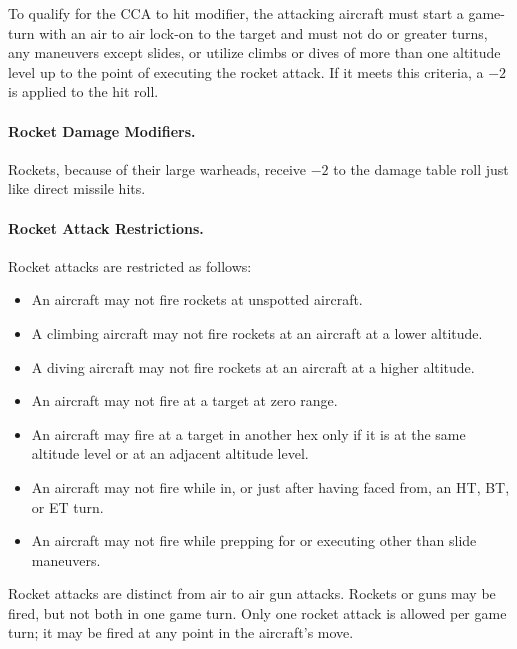 \begin{advancedrules}
{To qualify for the CCA to hit modifier, the attacking aircraft must start a game-turn with an air to air lock-on to the target and must not do  or greater turns, any maneuvers except slides, or utilize climbs or dives of more than one altitude level up to the point of executing the rocket attack. If it meets this criteria, a $-2$ is applied to the hit roll.

\paragraph{Rocket Damage Modifiers.} Rockets, because of their large warheads, receive $-2$ to the damage table roll just like direct missile hits.

\paragraph{Rocket Attack Restrictions.} Rocket attacks are restricted as follows:

\begin{itemize}

    \item An aircraft may not fire rockets at unspotted aircraft.

    \item A climbing aircraft may not fire rockets at an aircraft at a lower altitude.

    \item A diving aircraft may not fire rockets at an aircraft at a higher altitude.

    \item An aircraft may not fire at a target at zero range.

    \item An aircraft  may fire at a target in another hex only if it is at the same altitude level or at an adjacent altitude level.

    \item An aircraft may not fire while in, or just after having faced from, an HT, BT, or ET turn.

    \item An aircraft may not fire while prepping for or executing other than slide maneuvers.

\end{itemize}

}{
Rocket attacks are distinct from air to air gun attacks. Rockets or guns may be fired, but not both in one game turn. Only one rocket attack is allowed per game turn; it may be fired at any point in the aircraft's move.

}
\end{advancedrules}
